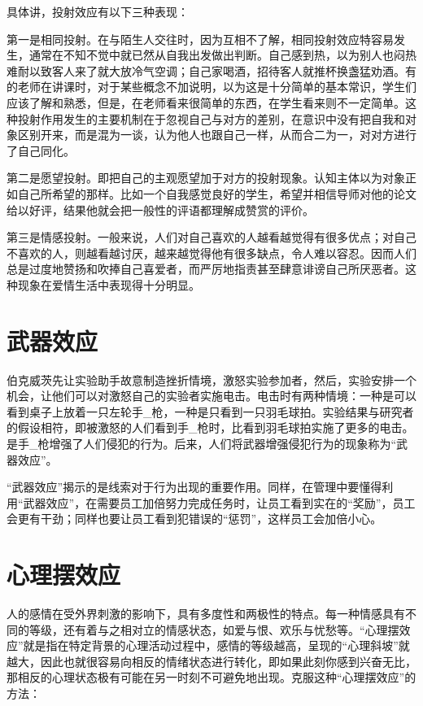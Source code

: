 \documentclass[11pt]{ctexart}
\begin{document}
具体讲，投射效应有以下三种表现：

第一是相同投射。在与陌生人交往时，因为互相不了解，相同投射效应特容易发生，通常在不知不觉中就已然从自我出发做出判断。自己感到热，以为别人也闷热难耐以致客人来了就大放冷气空调；自己家喝酒，招待客人就推杯换盏猛劝酒。有的老师在讲课时，对于某些概念不加说明，以为这是十分简单的基本常识，学生们应该了解和熟悉，但是，在老师看来很简单的东西，在学生看来则不一定简单。这种投射作用发生的主要机制在于忽视自己与对方的差别，在意识中没有把自我和对象区别开来，而是混为一谈，认为他人也跟自己一样，从而合二为一，对对方进行了自己同化。

第二是愿望投射。即把自己的主观愿望加于对方的投射现象。认知主体以为对象正如自己所希望的那样。比如一个自我感觉良好的学生，希望并相信导师对他的论文给以好评，结果他就会把一般性的评语都理解成赞赏的评价。

第三是情感投射。一般来说，人们对自己喜欢的人越看越觉得有很多优点；对自己不喜欢的人，则越看越讨厌，越来越觉得他有很多缺点，令人难以容忍。因而人们总是过度地赞扬和吹捧自己喜爱者，而严厉地指责甚至肆意诽谤自己所厌恶者。这种现象在爱情生活中表现得十分明显。
\section{武器效应}
\label{sec-94}


伯克威茨先让实验助手故意制造挫折情境，激怒实验参加者，然后，实验安排一个机会，让他们可以对激怒自己的实验者实施电击。电击时有两种情境：一种是可以看到桌子上放着一只左轮手_枪，一种是只看到一只羽毛球拍。实验结果与研究者的假设相符，即被激怒的人们看到手_枪时，比看到羽毛球拍实施了更多的电击。是手_枪增强了人们侵犯的行为。后来，人们将武器增强侵犯行为的现象称为“武器效应”。

“武器效应”揭示的是线索对于行为出现的重要作用。同样，在管理中要懂得利用“武器效应”，在需要员工加倍努力完成任务时，让员工看到实在的“奖励”，员工会更有干劲；同样也要让员工看到犯错误的“惩罚”，这样员工会加倍小心。
\section{心理摆效应}
\label{sec-95}


人的感情在受外界刺激的影响下，具有多度性和两极性的特点。每一种情感具有不同的等级，还有着与之相对立的情感状态，如爱与恨、欢乐与忧愁等。“心理摆效应”就是指在特定背景的心理活动过程中，感情的等级越高，呈现的“心理斜坡”就越大，因此也就很容易向相反的情绪状态进行转化，即如果此刻你感到兴奋无比，那相反的心理状态极有可能在另一时刻不可避免地出现。克服这种“心理摆效应”的方法：
\end{document}
